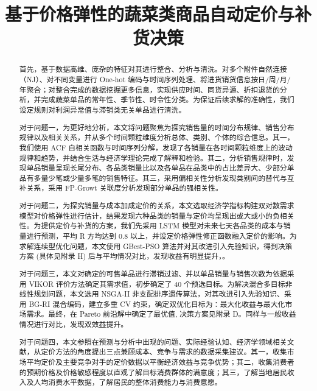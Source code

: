 \documentclass[withoutpreface,bwprint]{cumcmthesis} %
\title{基于价格弹性的蔬菜类商品自动定价与补货决策}
\begin{document}
\maketitle
\begin{abstract}

	首先，基于数据高维、庞杂的特征对其进行整合、分析与清洗。对多个附件自然连接（NJ）、对不同变量进行 One-hot 编码与时间序列处理、将进货销货信息按日/周/月/年聚合；对整合完成的数据挖掘更多信息，实现供应时间、同货异源、折扣退货的分析，并完成蔬菜单品的常年性、季节性、时令性分类。为保证后续求解的准确性，我们设定规则对利润异常值与滞销类无关单品进行清洗。

	对于问题一，为更好地分析，本文将问题聚焦为探究销售量的时间分布规律、销售分布规律以及相关关系，并从多个时间颗粒维度分析总体、类别、个体的综合信息。其一，我们使用 ACF 自相关函数与时间序列分解，发现了各销量在各时间颗粒维度上的波动规律和趋势，并结合生活与经济学理论完成了解释和检验。其二，分析销售规律时，发现单品销量呈现长尾分布、各品类销量比以及各单品在品类中的占比差异大、少部分单品有多量少笔或少量多笔的销售特征。其三，采用偏相关性分析发现类别间的替代与互补关系，采用 FP-Growt 关联度分析发现部分单品的强相关性。

	对于问题二，为探究销量与成本加成定价的关系，本文选取经济学指标构建双对数需求模型对价格弹性进行估计，结果发现六种品类的销量与定价均呈现出或大或小的负相关性。为提供定价与补货的方案，我们先采用 LSTM 模型对未来七天各品类的成本与销量进行预测，平均 R 方均达到 0.8 以上，并设定价格弹性修正函数融入定价的影响。为求解连续型优化问题，本文使用 GBest-PSO 算法并对其改进引入先验知识，得到决策方案 (具体见附录 H) 后与平均情况对比，发现收益有明显提升，。
	
	对于问题三，本文对确定的可售单品进行滞销过滤、并以单品销量与销售次数为依据采用 VIKOR 评价方法确定其需求值，初步确定了 40 个预选目标。为解决混合多目标非线性规划问题，本文选用 NSGA-II 非支配排序遗传算法，对其改进引入先验知识、采用 BG-RI 混合编码，建立多重 CV 约束，确定双优化目标为：最大化收益与最大化市场需求。最终，在 Pareto 前沿解中确定了最优值, 决策方案见附录 D。同样与一般收益情况进行对比，发现双效益提升。

	对于问题四，本文参照在预测与分析中出现的问题、实际经验认知、经济学领域相关文献，从定价方法的角度提出三点兼顾成本、竞争与需求的数据采集建议。其一，收集市场平均定价及主要竞争对手的定价数据以平衡经济效益与竞争优势；其二，收集消费者的预期价格及价格敏感程度以直观了解目标消费群体的满意度；其三，了解当地居民收入及人均消费水平数据，了解居民的整体消费能力与消费意愿。
	
\end{abstract}
\end{document}

